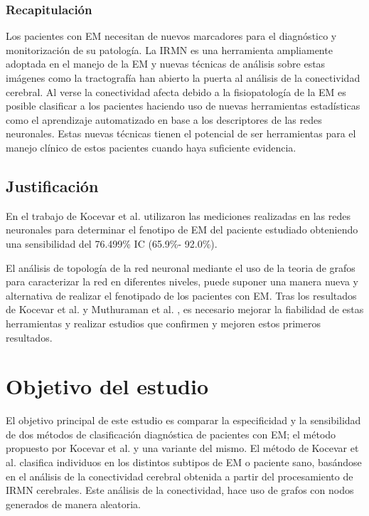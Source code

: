 \documentclass[fleqn,12pt]{UICArticle} %
\begin{document}
\subsubsection{Recapitulación}

Los pacientes con EM necesitan de nuevos marcadores para el diagnóstico y monitorización de su patología. La IRMN es una herramienta ampliamente adoptada en el manejo de la EM y nuevas técnicas de análisis sobre estas imágenes como la tractografía han abierto la puerta al análisis de la conectividad cerebral. Al verse la conectividad afecta debido a la fisiopatología de la EM es posible clasificar a los pacientes haciendo uso de nuevas herramientas estadísticas como el aprendizaje automatizado en base a los descriptores de las redes neuronales. Estas nuevas técnicas tienen el potencial de ser herramientas para el manejo clínico de estos pacientes cuando haya suficiente evidencia.

\subsection{Justificación}

En el trabajo de Kocevar et al.\cite{Kocevar2016} utilizaron las mediciones realizadas en las redes neuronales para determinar el fenotipo de EM del paciente estudiado obteniendo una sensibilidad del 76.499\% IC (65.9\%- 92.0\%).

El análisis de topología de la red neuronal mediante el uso de la teoria de grafos para caracterizar la red en diferentes niveles, puede suponer una manera nueva y alternativa de realizar el fenotipado de los pacientes con EM. Tras los resultados de Kocevar et al.\cite{Kocevar2016} y Muthuraman et al. \cite{Muthuraman2016}, es necesario mejorar la fiabilidad de estas herramientas y realizar estudios que confirmen y mejoren estos primeros resultados.


\section{Objetivo del estudio}

El objetivo principal de este estudio es comparar la especificidad y la sensibilidad de dos métodos de clasificación diagnóstica de pacientes con EM; el método propuesto por Kocevar et al.\cite{Kocevar2016} y una variante del mismo. El método de Kocevar et al.\cite{Kocevar2016} clasifica individuos en los distintos subtipos de EM o paciente sano, basándose en el análisis de la conectividad cerebral obtenida a partir del procesamiento de IRMN cerebrales. Este análisis de la conectividad, hace uso de grafos con nodos generados de manera aleatoria.
\end{document}
